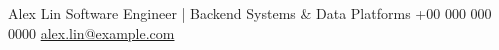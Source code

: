 \documentclass[a4paper,10pt]{article}
\begin{document}
\ResumeHeader
  {Alex Lin}
  {Software Engineer | Backend Systems \& Data Platforms}
  {\faPhone\enspace +00 000 000 0000\quad
   \faEnvelope\enspace \href{mailto:alex.lin@example.com}{alex.lin@example.com}\quad
   {\color{black}\faGithub}\enspace
   }

\end{document}
